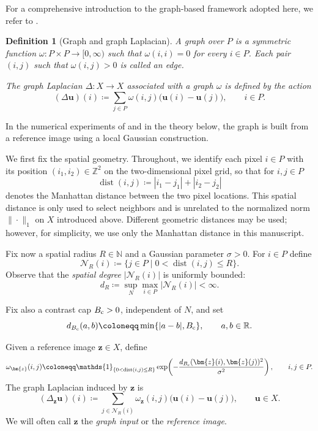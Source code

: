 \documentclass{article}
\newtheorem{definition}[theorem]{Definition}
\theoremstyle{remark}
\newcommand{\N}{\mathbb{N}}
\newcommand{\R}{\mathbb{R}}
\newcommand{\Ncal}{\mathcal{N}}
\newcommand{\bz}{{\bm{z}}}
\newcommand{\bu}{{\bm{u}}}
\begin{document}
For a comprehensive introduction to the graph-based framework adopted here, we refer to \cite{keller2021graphs}. 

\begin{definition}[Graph and graph Laplacian]
A graph over $P$ is a symmetric function $\omega\colon P\times P\to[0,\infty)$ such that $\omega(i,i)=0$ for every $i\in P$. Each pair $(i,j)$ such that $\omega(i,j)>0$ is called an \emph{edge}.

The graph Laplacian $\Delta\colon X\to X$ associated with a graph $\omega$ is defined by the action
\begin{equation*}
(\Delta \bu)(i)\coloneqq\sum_{j\in P}\omega(i,j)\bigl(\bu(i)-\bu(j)\bigr),
\qquad i\in P.
\end{equation*}
\end{definition}

In the numerical experiments of  and in the theory below, the graph is built from a reference image using a local Gaussian construction.

We first fix the spatial geometry. Throughout, we identify each pixel $i\in P$ with its position $(i_1,i_2)\in\mathbb{Z}^2$ on the two-dimensional pixel grid, so that for $i,j\in P$
\[
\operatorname{dist}(i,j)\coloneqq|i_1-j_1|+|i_2-j_2|
\]
denotes the Manhattan distance between the two pixel locations. This spatial distance is only used to select neighbors and is unrelated to the normalized norm $\|\cdot\|_1$ on $X$ introduced above. Different geometric distances may be used; however, for simplicity, we use only the Manhattan distance in this manuscript.

Fix now a spatial radius $R\in\N$ and a Gaussian parameter $\sigma>0$. For $i\in P$ define 
\[
\Ncal_R(i)\coloneqq\{j\in P \mid 0< \operatorname{dist}(i,j) \le R\}.
\]
Observe that the \emph{spatial degree} $|\Ncal_R(i)|$ is uniformly bounded:
\begin{equation}\label{eq:spatial-degree_uniform_norm}
d_R\coloneqq\sup_N\max_{i\in P}|\Ncal_R(i)|<\infty .
\end{equation}


Fix also a contrast cap $B_{\rm c}>0$, independent of $N$, and set
\begin{equation}\label{eq:contrast-cap}
d_{B_{\rm c}}(a,b)\coloneqq\min\{|a-b|,B_{\rm c}\},
\qquad a,b\in\R.
\end{equation}



Given a reference image $\bz\in X$, define
\begin{equation}\label{eq:gaussian-weights}
\omega_\bz(i,j)
\coloneqq\mathds{1}_{\{0<\operatorname{dist}(i,j)\le R\}}
\exp\!\left(-\frac{d_{B_{\rm c}}(\bz(i),\bz(j))^2}{\sigma^2}\right),
\qquad i,j\in P.
\end{equation}
The graph Laplacian induced by $\bz$ is
\begin{equation*}
(\Delta_\bz \bu)(i)
\coloneqq\sum_{j\in \Ncal_R(i)} \omega_\bz(i,j)\bigl(\bu(i)-\bu(j)\bigr),
\qquad \bu\in X .
\end{equation*}
We will often call $\bz$ the \emph{graph input} or the \emph{reference image}.
\end{document}
